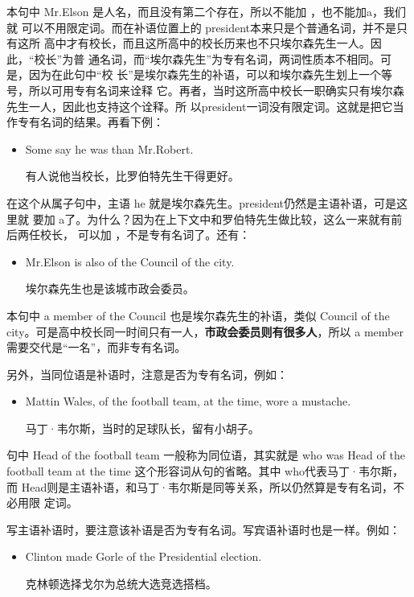 本句中 Mr.Elson 是人名，而且没有第二个存在，所以不能加 ，也不能加a，我们就
可以不用限定词。而在补语位置上的 president本来只是个普通名词，并不是只有这所
高中才有校长，而且这所高中的校长历来也不只埃尔森先生一人。因此，“校长”为普
通名词，而“埃尔森先生”为专有名词，两词性质本不相同。可是，因为在此句中“校
长”是埃尔森先生的补语，可以和埃尔森先生划上一个等号，所以可用专有名词来诠释
它。再者，当时这所高中校长一职确实只有埃尔森先生一人，因此也支持这个诠释。所
以president一词没有限定词。这就是把它当作专有名词的结果。再看下例：

\begin{itemize}
\item Some say he was  than Mr.Robert.

  有人说他当校长，比罗伯特先生干得更好。
\end{itemize}

在这个从属子句中，主语 he 就是埃尔森先生。president仍然是主语补语，可是这里就
要加 a了。为什么？因为在上下文中和罗伯特先生做比较，这么一来就有前后两任校长，
可以加 ，不是专有名词了。还有：

\begin{itemize}
\item  Mr.Elson is also  of the Council of the city.

  埃尔森先生也是该城市政会委员。
\end{itemize}

本句中 a member of the Council 也是埃尔森先生的补语，类似 Council of the
city。可是高中校长同一时间只有一人，\textbf{市政会委员则有很多人}，所以 a
member需要交代是“一名”，而非专有名词。

另外，当同位语是补语时，注意是否为专有名词，例如：

\begin{itemize}
\item Mattin Wales,  of the football team, at the time, wore a
  mustache.

  马丁·韦尔斯，当时的足球队长，留有小胡子。
\end{itemize}

句中 Head of the football team 一般称为同位语，其实就是 who was Head of the
football team at the time 这个形容词从句的省略。其中 who代表马丁·韦尔斯，
而 Head则是主语补语，和马丁·韦尔斯是同等关系，所以仍然算是专有名词，不必用限
定词。

写主语补语时，要注意该补语是否为专有名词。写宾语补语时也是一样。例如：

\begin{itemize}
\item  Clinton made Gorle  of the Presidential election.

  克林顿选择戈尔为总统大选竞选搭档。
\end{itemize}

